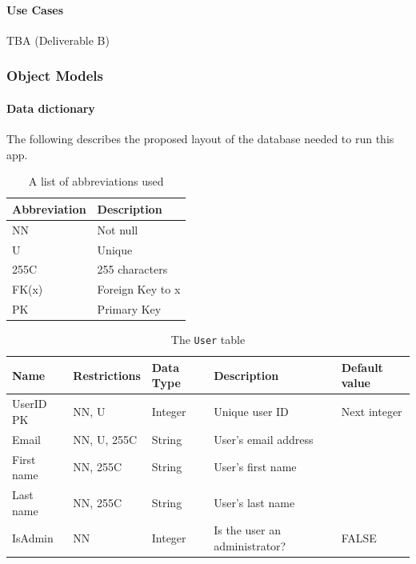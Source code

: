\documentclass[a4paper, 11pt, titlepage]{article}
\begin{document}
\paragraph{Use Cases}
TBA (Deliverable B)

\subsubsection{Object Models}
\paragraph{Data dictionary}
The following describes the proposed layout of the database needed to run this app. 
\begin{table}[H]
  \centering
  \caption{A list of abbreviations used}
    \begin{tabular}{ll}
    \hline
    Abbreviation & Description \\
    \hline
    NN    & Not null \\
    U     & Unique \\
    255C  & 255 characters \\
    FK(x) & Foreign Key to x \\
    PK    & Primary Key \\
    \hline
    \end{tabular}%
  \label{tab:abbreviations}%
\end{table}%

\begin{table}[H]
  \centering
  \caption{The \texttt{User} table}
    \begin{tabularx}{\textwidth}{lllXl}
    \hline
    Name  & Restrictions & Data Type & Description & Default value \\
    \hline
    UserID PK & NN, U & Integer & Unique user ID & Next integer \\
    Email & NN, U, 255C & String & User's email address &  \\
    First name & NN, 255C & String & User's first name &  \\
    Last name & NN, 255C & String & User's last name &  \\
    IsAdmin & NN    & Integer & Is the user an administrator? & FALSE \\
    \hline
    \end{tabularx}%
  \label{tab:dd:User}%
\end{table}%
\end{document}
